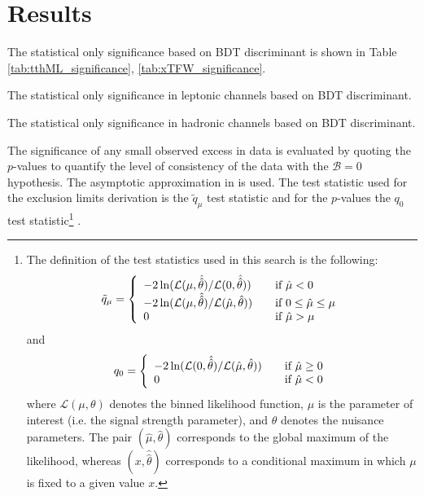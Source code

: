 \section{Results}
\label{sec:results}

The statistical only significance based on BDT discriminant is shown in Table \ref{tab:tthML_significance}, \ref{tab:xTFW_significance}.

\begin{table}
\caption{The statistical only significance in leptonic channels based on BDT discriminant.}
\label{tab:tthML_significance}

\end{table}

\begin{table}
\caption{The statistical only significance in hadronic channels based on BDT discriminant.}
\label{tab:xTFW_significance}

\end{table}

The significance of any small observed excess in data is evaluated by quoting the $p$-values to quantify the level of consistency of the data with the $\mathcal{B}=0$ hypothesis. The asymptotic approximation in \cite{CCGV} is used. The test statistic used for the exclusion limits derivation is the $\tilde{q}_\mu$ test statistic
and for the $p$-values the $q_{0}$ test statistic\footnote{The definition of the test statistics used in this search is the following:
\[ \tilde q_\mu = \left\{
  \begin{array}{l l}
    -2 \ln (\mathcal{L}(\mu,\hat{\hat{\theta}})/\mathcal{L}(0,\hat{\hat\theta})) & \quad \text{if $\hat\mu < 0$}\\
    -2 \ln (\mathcal{L}(\mu,\hat{\hat{\theta}})/\mathcal{L}(\hat \mu,\hat\theta)) & \quad \text{if $0 \leq \hat\mu \leq \mu$}\\
    0 & \quad \text{if $\hat\mu > \mu$}
  \end{array} \right.\]
and
\[ q_0 = \left\{
  \begin{array}{l l}
    -2 \ln (\mathcal{L}(0,\hat{\hat{\theta}})/\mathcal{L}(\hat\mu,\hat\theta)) &\quad \text{if $\hat\mu \geq 0$}\\
    0 & \quad \text{if $\hat\mu <0$}
  \end{array} \right.\]
where $\mathcal L(\mu,\theta)$ denotes the binned likelihood function, $\mu$ is the parameter of interest (i.e.
the signal strength parameter), and $\theta$ denotes the nuisance parameters. The pair $(\hat\mu, \hat\theta)$
corresponds to the global maximum of the likelihood, whereas $(x, \hat{\hat\theta})$ corresponds to a conditional
maximum in which $\mu$ is fixed to a given value $x$.
}
\cite{CCGV}.

